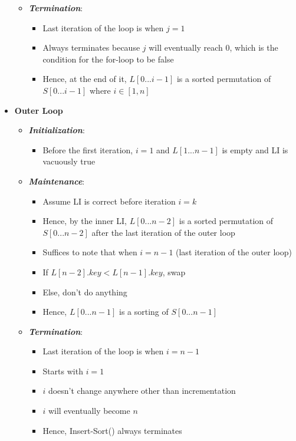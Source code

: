 \documentclass[10pt, 
a4paper, 
oneside, 
headinclude, footinclude, 
BCOR5mm]
{scrartcl}
\begin{document}
\begin{definition}
\begin{itemize}
\begin{itemize}
            \item \textit{\textbf{Termination}}:
            \begin{itemize}
                \item Last iteration of the loop is when $j=1$
                \item Always terminates because $j$ will eventually reach 0, which is the condition for the for-loop to be false
                \item Hence, at the end of it, $L[0...i-1]$ is a sorted permutation of $S[0...i-1]$ where $i\in[1,n]$
            \end{itemize}
        \end{itemize}
        \item \textbf{Outer Loop}
        \begin{itemize}
            \item \textit{\textbf{Initialization}}:
            \begin{itemize}
                \item Before the first iteration, $i=1$ and $L[1...n-1]$ is empty and LI is vacuously true
            \end{itemize}
            \item \textit{\textbf{Maintenance}}:
            \begin{itemize}
                \item Assume LI is correct before iteration $i=k$
                \item Hence, by the inner LI, $L[0...n-2]$ is a sorted permutation of $S[0...n-2]$ after the last iteration of the outer loop
                \item Suffices to note that when $i=n-1$ (last iteration of the outer loop)
                \item If $L[n-2].key < L[n-1].key$, swap
                \item Else, don't do anything
                \item Hence, $L[0...n-1]$ is a sorting of $S[0...n-1]$
            \end{itemize}
            \item \textit{\textbf{Termination}}:
            \begin{itemize}
                \item Last iteration of the loop is when $i=n-1$
                \item Starts with $i=1$
                \item $i$ doesn't change anywhere other than incrementation
                \item $i$ will eventually become $n$
                \item Hence, Insert-Sort() always terminates
            \end{itemize}
        \end{itemize}
    \end{itemize}
\end{definition}
\newpage
\end{document}
